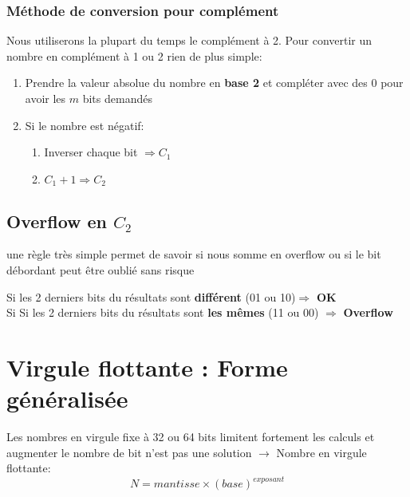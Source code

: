 \subsubsection{Méthode de conversion pour complément}
Nous utiliserons la plupart du temps le complément à 2. Pour convertir un nombre en complément à 1 ou 2 rien de plus simple: 
\begin{enumerate}
	\item Prendre la valeur absolue du nombre en \textbf{base 2} et compléter avec des 0 pour avoir les $m$ bits demandés
	\item Si le nombre est négatif: 
	\begin{enumerate}
		\item Inverser chaque bit $\Rightarrow C_1$
		\item $C_1+1\Rightarrow C_2$
	\end{enumerate}
\end{enumerate}
\subsection{Overflow en $C_2$}
une règle très simple permet de savoir si nous somme en overflow ou si le bit débordant peut être oublié sans risque
\begin{center}
	Si les 2 derniers bits du résultats sont \textbf{différent} (01 ou 10)$\Rightarrow$ \textbf{OK}\\
	Si Si les 2 derniers bits du résultats sont \textbf{les mêmes} (11 ou 00) $\Rightarrow$ \textbf{Overflow}
\end{center}
\section{Virgule flottante : Forme généralisée}
Les nombres en virgule fixe à 32 ou 64 bits limitent fortement les calculs et augmenter le nombre de bit n'est pas une solution $\rightarrow$ Nombre en virgule flottante:
\begin{equation}
N=mantisse\times(base)^{exposant}
\end{equation}
